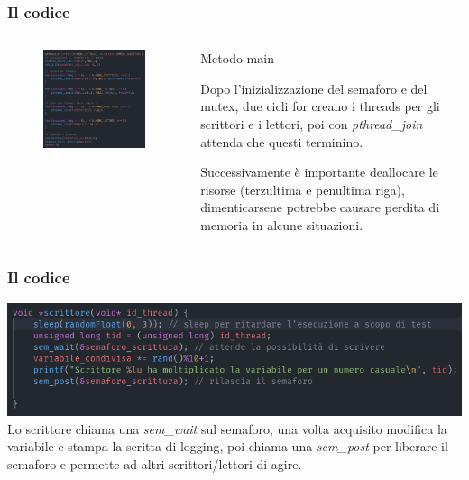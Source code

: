 \documentclass[10pt]{beamer}
\begin{document}
	\begin{frame}[fragile]
		\frametitle{Il codice}
		\begin{columns}
			\begin{column}{0.3\textwidth}
				
				\begin{figure}
					\centering
					\includegraphics[width=2\linewidth]{img/main}
				\end{figure}
				
			\end{column}\hspace{100pt}
			\begin{column}{0.3\textwidth}
				Metodo main
				
				Dopo l'inizializzazione del semaforo e del mutex, due cicli for creano i threads per gli scrittori e i lettori, poi con \emph{pthread\_join} attenda che questi terminino.
				
				Successivamente è importante deallocare le risorse (terzultima e penultima riga), dimenticarsene potrebbe causare perdita di memoria in alcune situazioni.
			\end{column}
		\end{columns}
	\end{frame}

\begin{frame}[fragile]
	\frametitle{Il codice}
			
			\centering
			\includegraphics[width=\linewidth]{img/scrittore}
			Lo scrittore chiama una \emph{sem\_wait} sul semaforo, una volta acquisito modifica la variabile e stampa la scritta di logging, poi chiama una \emph{sem\_post} per liberare il semaforo e permette ad altri scrittori/lettori di agire.
\end{frame}
\end{document}
